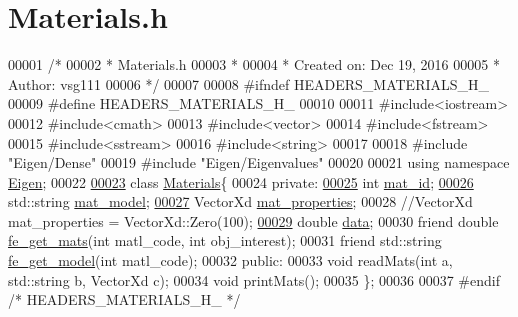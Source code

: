 \hypertarget{_materials_8h_source}{}\section{Materials.\+h}
\label{_materials_8h_source}

\begin{DoxyCode}
00001 \textcolor{comment}{/*}
00002 \textcolor{comment}{ * Materials.h}
00003 \textcolor{comment}{ *}
00004 \textcolor{comment}{ *  Created on: Dec 19, 2016}
00005 \textcolor{comment}{ *      Author: vsg111}
00006 \textcolor{comment}{ */}
00007 
00008 \textcolor{preprocessor}{#ifndef HEADERS\_MATERIALS\_H\_}
00009 \textcolor{preprocessor}{#define HEADERS\_MATERIALS\_H\_}
00010 
00011 \textcolor{preprocessor}{#include<iostream>}
00012 \textcolor{preprocessor}{#include<cmath>}
00013 \textcolor{preprocessor}{#include<vector>}
00014 \textcolor{preprocessor}{#include<fstream>}
00015 \textcolor{preprocessor}{#include<sstream>}
00016 \textcolor{preprocessor}{#include<string>}
00017 
00018 \textcolor{preprocessor}{#include "Eigen/Dense"}
00019 \textcolor{preprocessor}{#include "Eigen/Eigenvalues"}
00020 
00021 \textcolor{keyword}{using namespace }\hyperlink{namespace_eigen}{Eigen};
00022 
\hyperlink{class_materials}{00023} \textcolor{keyword}{class }\hyperlink{class_materials}{Materials}\{
00024 \textcolor{keyword}{private}:
\hyperlink{class_materials_a9687f294a4ae4b2603eed657ee7dbebf}{00025}     \textcolor{keywordtype}{int} \hyperlink{class_materials_a9687f294a4ae4b2603eed657ee7dbebf}{mat\_id};
\hyperlink{class_materials_abe8d649257d71769de7a3aa20ff8977e}{00026}     std::string \hyperlink{class_materials_abe8d649257d71769de7a3aa20ff8977e}{mat\_model};
\hyperlink{class_materials_af663f6cf518ba3f857bac40a1e33eac0}{00027}     VectorXd \hyperlink{class_materials_af663f6cf518ba3f857bac40a1e33eac0}{mat\_properties};
00028     \textcolor{comment}{//VectorXd mat\_properties = VectorXd::Zero(100);}
\hyperlink{class_materials_ae1d76dc4fa0500285c6759f55038e4c6}{00029}     \textcolor{keywordtype}{double} \hyperlink{class_materials_ae1d76dc4fa0500285c6759f55038e4c6}{data};
00030     \textcolor{keyword}{friend} \textcolor{keywordtype}{double} \hyperlink{functions_8h_af7ffbad6dfcc99fc88b130c1a7b1720a}{fe\_get\_mats}(\textcolor{keywordtype}{int} matl\_code, \textcolor{keywordtype}{int} obj\_interest);
00031     \textcolor{keyword}{friend} std::string \hyperlink{functions_8h_a34d6fb85943d945b7e8600d2ef4220d0}{fe\_get\_model}(\textcolor{keywordtype}{int} matl\_code);
00032 \textcolor{keyword}{public}:
00033     \textcolor{keywordtype}{void} readMats(\textcolor{keywordtype}{int} a, std::string b, VectorXd c);
00034     \textcolor{keywordtype}{void} printMats();
00035 \};
00036 
00037 \textcolor{preprocessor}{#endif }\textcolor{comment}{/* HEADERS\_MATERIALS\_H\_ */}\textcolor{preprocessor}{}
\end{DoxyCode}
